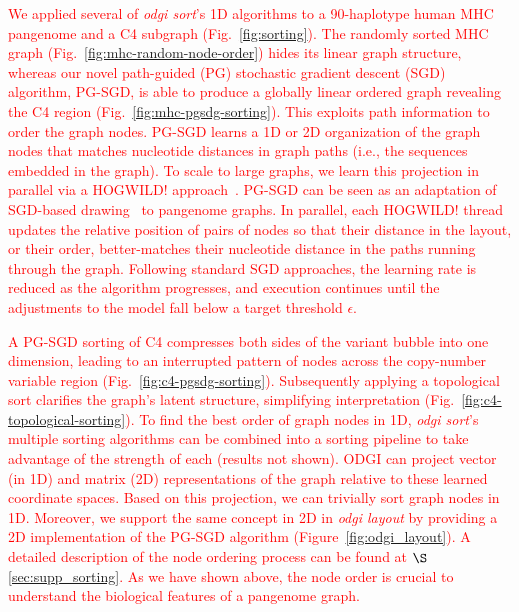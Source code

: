 \documentclass{bioinfo}
\newcommand{\REVIEWED}[1]{{\textcolor{Red}{#1}}}
\begin{document}
\REVIEWED{We applied several of \textit{odgi sort}'s 1D algorithms to a 90-haplotype human MHC pangenome and a C4 subgraph (Fig.~\ref{fig:sorting}).
The randomly sorted MHC graph (Fig.~\ref{fig:mhc-random-node-order}) hides its linear graph structure, whereas our novel path-guided (PG) stochastic gradient descent (SGD) algorithm, PG-SGD, is able to produce a globally linear ordered graph revealing the C4 region (Fig.~\ref{fig:mhc-pgsdg-sorting}).
This exploits path information to order the graph nodes.
PG-SGD learns a 1D or 2D organization of the graph nodes that matches nucleotide distances in graph paths (i.e., the sequences embedded in the graph).
To scale to large graphs, we learn this projection in parallel via a HOGWILD! approach~\citep{niu2011hogwild}.
PG-SGD can be seen as an adaptation of SGD-based drawing~\citep{zheng2018graph} to pangenome graphs.
In parallel, each HOGWILD! thread updates the relative position of pairs of nodes so that their distance in the layout, or their order, better-matches  their nucleotide distance in the paths running through the graph.
Following standard SGD approaches, the learning rate is reduced as the algorithm progresses, and execution continues until the adjustments to the model fall below a target threshold $\epsilon$.}

\REVIEWED{A PG-SGD sorting of C4 compresses both sides of the variant bubble into one dimension, leading to an interrupted pattern of nodes across the copy-number variable region (Fig.~\ref{fig:c4-pgsdg-sorting}).
Subsequently applying a topological sort clarifies the graph's latent structure, simplifying interpretation (Fig.~\ref{fig:c4-topological-sorting}). }
%
\REVIEWED{To find the best order of graph nodes in 1D, \textit{odgi sort}'s multiple sorting algorithms can be combined into a sorting pipeline to take advantage of the strength of each (results not shown).
ODGI can project vector (in 1D) and matrix (2D) representations of the graph relative to these learned coordinate spaces.
Based on this projection, we can trivially sort graph nodes in 1D.
Moreover, we support the same concept in 2D in \textit{odgi layout} by providing a 2D implementation of the PG-SGD algorithm (Figure~\ref{fig:odgi_layout}). A detailed description of the node ordering process can be found at $\S$\ref{sec:supp_sorting}. As we have shown above, the node order is crucial to understand the biological features of a pangenome graph.}
\end{document}
